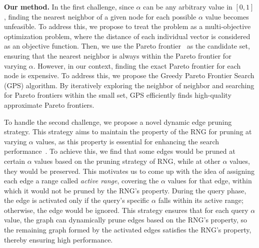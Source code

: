 \noindent\textbf{Our method.} 
In the first challenge, since $\alpha$ can be any arbitrary value in $[0,1]$, finding the nearest neighbor of a given node for each possible $\alpha$ value becomes unfeasible.
To address this, we propose to treat the problem as a multi-objective optimization problem, where the distance of each individual vector is considered as an objective function. Then, we %
use the Pareto frontier~\cite{ma2020efficient} %
as the candidate set, ensuring that the nearest neighbor is always within the Pareto frontier for varying $\alpha$. However, in our context, finding the exact Pareto frontier for each node is expensive. To address this, we propose the Greedy Pareto Frontier Search (GPS) algorithm. 
%
By iteratively exploring the neighbor of neighbor and searching for Pareto frontiers within the small set, GPS efficiently finds high-quality approximate Pareto frontiers.



To handle the second challenge, we propose a novel dynamic edge pruning strategy. This strategy aims to maintain the property of the RNG for pruning 
at varying $\alpha$ values, as this property is essential for enhancing the search performance~\cite{wang2021comprehensive}. 
To achieve this, 
we find that some edges {\cheng would} be pruned at certain $\alpha$ values based on the pruning strategy of RNG, while at other $\alpha$ values, they {\cheng would} be preserved. This motivates us to come up with the idea of assigning each edge {\cheng a range called \emph{active range}}, covering the 
$\alpha$ values for that edge, within which it {\cheng would} not be pruned by the RNG's property. During the query phase, the edge is activated only if the query's specific $\alpha$ falls within its active range; otherwise, the edge {\cheng would} be ignored. This strategy ensures that for each query $\alpha$ value, the graph can dynamically prune edges based on the RNG's property, so the remaining graph formed by the activated edges satisfies the RNG's property, thereby ensuring high performance.


